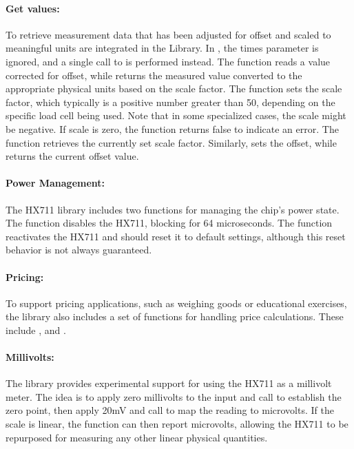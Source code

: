\paragraph{Get values:}
To retrieve measurement data that has been adjusted for offset and scaled to meaningful units  are integrated in the Library. In , the times parameter is ignored, and a single call to  is performed instead. The   function reads a value corrected for offset, while  returns the measured value converted to the appropriate physical units based on the scale factor. The  function sets the scale factor, which typically is a positive number greater than 50, depending on the specific load cell being used. Note that in some specialized cases, the scale might be negative. If scale is zero, the function returns false to indicate an error. The  function retrieves the currently set scale factor. Similarly,  sets the offset, while  returns the current offset value.

\paragraph{Power Management:}
The HX711 library includes two functions for managing the chip’s power state. The  function disables the HX711, blocking for 64 microseconds. The  function reactivates the HX711 and should reset it to default settings, although this reset behavior is not always guaranteed.

\paragraph{Pricing:}
To support pricing applications, such as weighing goods or educational exercises, the library also includes a set of functions for handling price calculations. These include ,  and .

\paragraph{Millivolts:}
The library provides experimental support for using the HX711 as a millivolt meter. The idea is to apply zero millivolts to the input and call  to establish the zero point, then apply 20mV and call  to map the reading to microvolts. If the scale is linear, the  function can then report microvolts, allowing the HX711 to be repurposed for measuring any other linear physical quantities.

